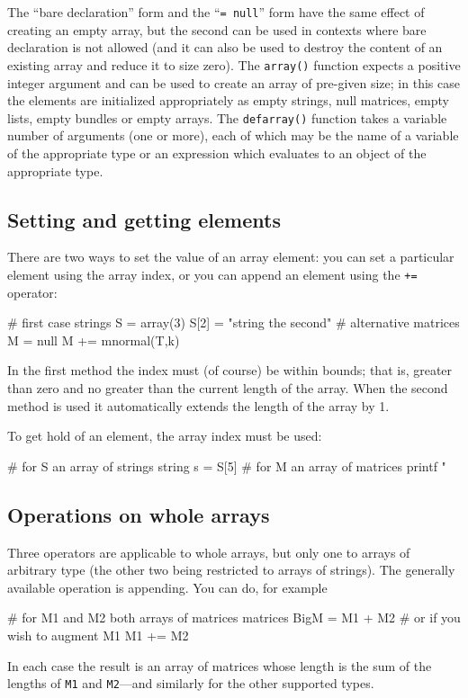 The ``bare declaration'' form and the ``\texttt{= null}'' form have
the same effect of creating an empty array, but the second can be used
in contexts where bare declaration is not allowed (and it can also be
used to destroy the content of an existing array and reduce it to size
zero). The \texttt{array()} function expects a positive integer
argument and can be used to create an array of pre-given size; in this
case the elements are initialized appropriately as empty strings, null
matrices, empty lists, empty bundles or empty arrays. The
\texttt{defarray()} function takes a variable number of arguments (one
or more), each of which may be the name of a variable of the
appropriate type or an expression which evaluates to an object of the
appropriate type.

\subsection{Setting and getting elements}

There are two ways to set the value of an array element: you can set a
particular element using the array index, or you can append an element
using the \texttt{+=} operator:
\begin{code}
# first case
strings S = array(3)
S[2] = "string the second"
# alternative
matrices M = null
M += mnormal(T,k)
\end{code}

In the first method the index must (of course) be within bounds; that
is, greater than zero and no greater than the current length of the
array. When the second method is used it automatically extends the
length of the array by 1.

To get hold of an element, the array index must be used:
\begin{code}
# for S an array of strings
string s = S[5]
# for M an array of matrices
printf "\n%
\end{code}

\subsection{Operations on whole arrays}

Three operators are applicable to whole arrays, but only one to
arrays of arbitrary type (the other two being restricted to arrays of
strings). The generally available operation is appending. You can do,
for example
\begin{code}
# for M1 and M2 both arrays of matrices
matrices BigM = M1 + M2
# or if you wish to augment M1
M1 += M2
\end{code}
In each case the result is an array of matrices whose length is the sum
of the lengths of \texttt{M1} and \texttt{M2}---and similarly for the
other supported types.

